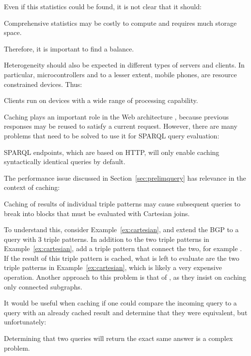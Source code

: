 Even if this statistics could be found, it is not clear that it should:
\begin{problem}\label{prob:largestats}
Comprehensive statistics may be costly to compute and requires much
storage space.
\end{problem}
Therefore, it is important to find a balance.



Heterogeneity should also be expected in different types of servers
and clients. In particular, microcontrollers and to a lesser extent,
mobile phones, are resource constrained devices. Thus:

\begin{problem}\label{prob:microcontroller}
Clients run on devices with a wide range of processing capability.
\end{problem}



Caching plays an important role in the Web architecture
\cite{Jacobs:04:AWW}, because previous responses may be reused to
satisfy a current request. However, there are many problems that need
to be solved to use it for SPARQL query evaluation:

\begin{problem}\label{prob:syntacticcache}
SPARQL endpoints, which are based on HTTP, will only enable caching
syntactically identical queries by  default.
\end{problem}

The performance issue discussed in Section~\ref{sec:prelimquery} has
relevance in the context of caching:

\begin{problem}\label{prob:cachecartesian}
Caching of results of individual triple patterns may cause subsequent
queries to break into blocks that must be evaluated with Cartesian joins.
\end{problem}

To understand this, consider Example~\ref{ex:cartesian}, and extend
the BGP to a query with 3 triple patterns. In addition to the two
triple patterns in Example~\ref{ex:cartesian}, add a triple pattern that
connect the two, for example
. If the result of this
triple pattern is cached, what is left to evaluate are the two triple
patterns in Example~\ref{ex:cartesian}, which is likely a very
expensive operation. Another approach to this problem is that of
\cite{papailiou2015graph}, as they insist on caching only connected 
subgraphs.

It would be useful when caching if one could compare the incoming
query to a query with an already cached result and determine that they
were equivalent, but unfortunately:
\begin{problem}\label{prob:queryeq}
Determining that two queries will return the exact same answer is a
complex problem.
\end{problem}



